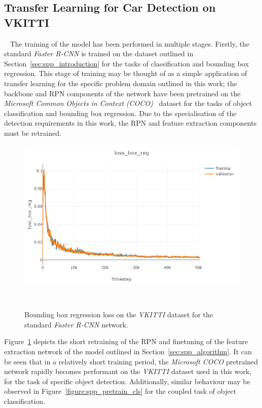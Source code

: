 \subsection{Transfer Learning for Car Detection on VKITTI}
~\label{sec:spp_quantitative_transfer}
The training of the model has been performed in multiple stages. Firstly, the standard \textit{Faster R-CNN} 
is trained on the dataset outlined in Section~\ref{sec:spp_introduction} for the tasks of classification and 
bounding box regression. This stage of training may be thought of as a simple application of transfer learning 
for the specific problem domain outlined in this work; the backbone and RPN components of the network 
have been pretrained on the \textit{Microsoft Common Objects in Context (COCO)}~\cite{Lin2014COCO} dataset for 
the tasks of object classification and bounding box regression. Due to the specialisation of the detection 
requirements in this work, the RPN and feature extraction components must be retrained.

\begin{figure}[!htbp]
  \centering
  \includegraphics[width=.6\linewidth]{figures/spp/quant/rcnn_pretrain/bb.png}
  \caption[VKITTI Bounding Box Training]{Bounding box regression loss on the \textit{VKITTI} 
  dataset for the standard \textit{Faster R-CNN} network.}
~\label{figure:spp_pretrain_bb}
\end{figure}

Figure~\ref{figure:spp_pretrain_bb} depicts the short retraining of the RPN and finetuning of the feature extraction 
network of the model outlined in Section~\ref{sec:spp_algorithm}. It can be seen that in a relatively short training period, 
the \textit{Microsoft COCO} pretrained network rapidly becomes performant on the \textit{VKITTI} dataset used in this work, 
for the task of specific object detection. Additionally, similar behaviour may be observed in Figure~\ref{figure:spp_pretrain_cls} 
for the coupled task of object classification.


